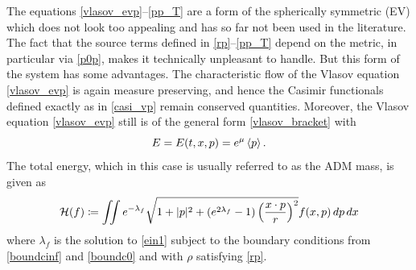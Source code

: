 \documentclass[11pt]{article}
\begin{document}
The equations \eqref{vlasov_evp}--\eqref{pp_T} are a form of the spherically
symmetric (EV) which does not look too appealing and has so far not been used
in the literature. The fact that the source terms defined in
\eqref{rp}--\eqref{pp_T} depend on the metric,
in particular via \eqref{p0p}, makes it technically unpleasant to handle.
But this form of the system has some advantages. The characteristic flow
of the Vlasov equation \eqref{vlasov_evp} is again measure preserving,
and hence the Casimir functionals defined exactly as in \eqref{casi_vp}
remain conserved quantities.
Moreover, the Vlasov equation \eqref{vlasov_evp} still is of the general form
\eqref{vlasov_bracket} with
\[ 
E = E(t,x,p) = e^\mu \left\langle p\right\rangle.
\]
The total energy, which in this case is usually referred to as the ADM mass,
is given as
\begin{equation} \label{energy_evp}
  {\cal H}(f)
  \coloneqq \iint e^{-\lambda_f}
  \sqrt{1+|p|^2 +(e^{2\lambda_f}-1)\left(\frac{x\cdot p}{r}\right)^2}
  f(x,p)\,dp\,dx
\end{equation}
where $\lambda_f$ is the solution to \eqref{ein1} subject to the boundary
conditions from \eqref{boundcinf} and \eqref{boundc0} and with $\rho$
satisfying \eqref{rp}.
\end{document}
